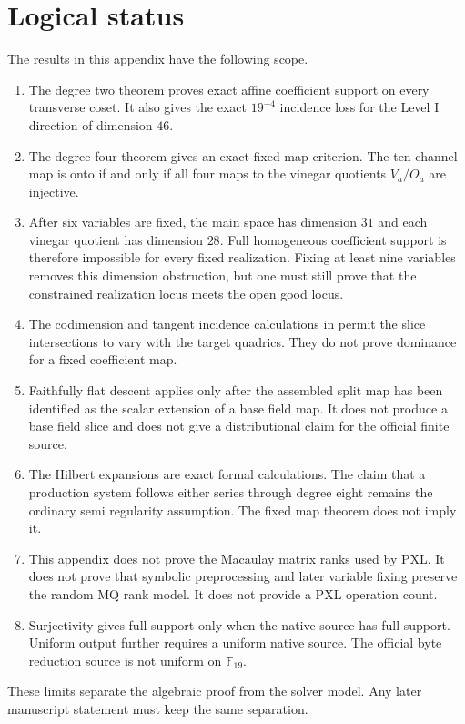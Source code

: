 \documentclass[11pt]{article}
\newcommand{\F}{\mathbb F}
\theoremstyle{plain}
\theoremstyle{definition}
\theoremstyle{remark}
\begin{document}
\section{Logical status}

The results in this appendix have the following scope.

\begin{enumerate}
\item The degree two theorem proves exact affine coefficient support on every
      transverse coset.  It also gives the exact $19^{-4}$ incidence loss for
      the Level I direction of dimension $46$.

\item The degree four theorem gives an exact fixed map criterion.  The ten
      channel map is onto if and only if all four maps to the vinegar
      quotients $V_a/O_a$ are injective.

\item After six variables are fixed, the main space has dimension $31$ and
      each vinegar quotient has dimension $28$.  Full homogeneous coefficient
      support is therefore impossible for every fixed realization.  Fixing at
      least nine variables removes this dimension obstruction, but one must
      still prove that the constrained realization locus meets the open good
      locus.

\item The codimension and tangent incidence calculations in
       permit the slice intersections to vary with
      the target quadrics.  They do not prove dominance for a fixed
      coefficient map.

\item Faithfully flat descent applies only after the assembled split map has
      been identified as the scalar extension of a base field map.  It does
      not produce a base field slice and does not give a distributional claim
      for the official finite source.

\item The Hilbert expansions are exact formal calculations.  The claim that a
      production system follows either series through degree eight remains the
      ordinary semi regularity assumption.  The fixed map theorem does not
      imply it.

\item This appendix does not prove the Macaulay matrix ranks used by PXL.  It
      does not prove that symbolic preprocessing and later variable fixing
      preserve the random MQ rank model.  It does not provide a PXL operation
      count.

\item Surjectivity gives full support only when the native source has full
      support.  Uniform output further requires a uniform native source.  The
      official byte reduction source is not uniform on $\F_{19}$.
\end{enumerate}

These limits separate the algebraic proof from the solver model.  Any later
manuscript statement must keep the same separation.
\end{document}
